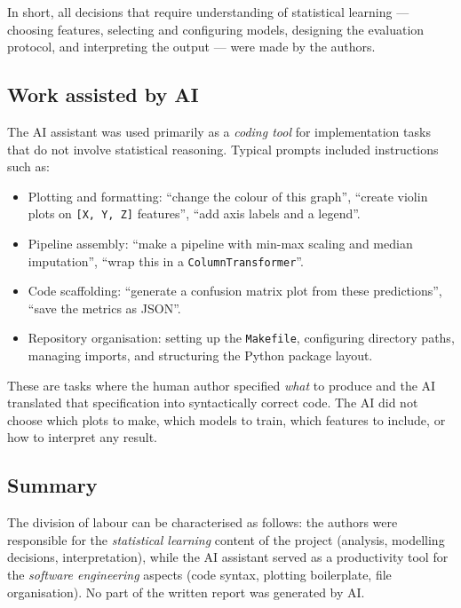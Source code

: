 In short, all decisions that require understanding of statistical learning
--- choosing features, selecting and configuring models, designing the
evaluation protocol, and interpreting the output --- were made by the authors.

\subsection*{Work assisted by AI}

The AI assistant was used primarily as a \emph{coding tool} for implementation
tasks that do not involve statistical reasoning.
Typical prompts included instructions such as:

\begin{itemize}
  \item Plotting and formatting: ``change the colour of this graph'',
    ``create violin plots on \texttt{[X, Y, Z]} features'',
    ``add axis labels and a legend''.
  \item Pipeline assembly: ``make a pipeline with min-max scaling and median
    imputation'', ``wrap this in a \texttt{ColumnTransformer}''.
  \item Code scaffolding: ``generate a confusion matrix plot from these
    predictions'', ``save the metrics as JSON''.
  \item Repository organisation: setting up the \texttt{Makefile},
    configuring directory paths, managing imports, and structuring the
    Python package layout.
\end{itemize}

These are tasks where the human author specified \emph{what} to produce and
the AI translated that specification into syntactically correct code.
The AI did not choose which plots to make, which models to train, which
features to include, or how to interpret any result.

\subsection*{Summary}

The division of labour can be characterised as follows: the authors were
responsible for the \emph{statistical learning} content of the project
(analysis, modelling decisions, interpretation), while the AI assistant
served as a productivity tool for the \emph{software engineering} aspects
(code syntax, plotting boilerplate, file organisation).
No part of the written report was generated by AI.
